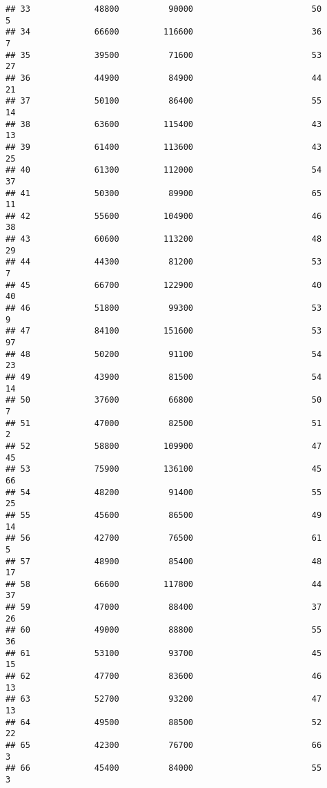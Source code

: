 \documentclass[
]{article}
\begin{document}
\begin{verbatim}
## 33             48800          90000                        50            5
## 34             66600         116600                        36            7
## 35             39500          71600                        53           27
## 36             44900          84900                        44           21
## 37             50100          86400                        55           14
## 38             63600         115400                        43           13
## 39             61400         113600                        43           25
## 40             61300         112000                        54           37
## 41             50300          89900                        65           11
## 42             55600         104900                        46           38
## 43             60600         113200                        48           29
## 44             44300          81200                        53            7
## 45             66700         122900                        40           40
## 46             51800          99300                        53            9
## 47             84100         151600                        53           97
## 48             50200          91100                        54           23
## 49             43900          81500                        54           14
## 50             37600          66800                        50            7
## 51             47000          82500                        51            2
## 52             58800         109900                        47           45
## 53             75900         136100                        45           66
## 54             48200          91400                        55           25
## 55             45600          86500                        49           14
## 56             42700          76500                        61            5
## 57             48900          85400                        48           17
## 58             66600         117800                        44           37
## 59             47000          88400                        37           26
## 60             49000          88800                        55           36
## 61             53100          93700                        45           15
## 62             47700          83600                        46           13
## 63             52700          93200                        47           13
## 64             49500          88500                        52           22
## 65             42300          76700                        66            3
## 66             45400          84000                        55            3

\end{verbatim}
\end{document}
